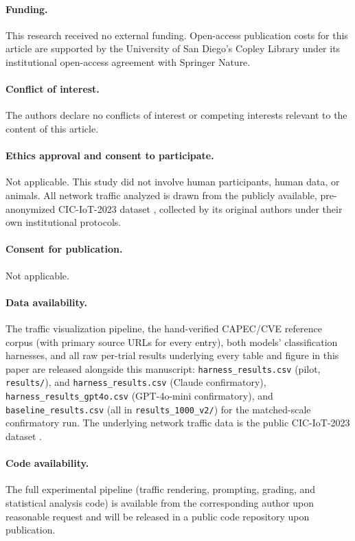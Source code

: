 \documentclass[10pt,twocolumn]{article}
\begin{document}
\paragraph{Funding.} This research received no external funding. Open-access publication costs
for this article are supported by the University of San Diego's Copley Library under its
institutional open-access agreement with Springer Nature.

\paragraph{Conflict of interest.} The authors declare no conflicts of interest or competing
interests relevant to the content of this article.

\paragraph{Ethics approval and consent to participate.} Not applicable. This study did not
involve human participants, human data, or animals. All network traffic analyzed is drawn from
the publicly available, pre-anonymized CIC-IoT-2023 dataset \cite{cic-iot-2023}, collected by its
original authors under their own institutional protocols.

\paragraph{Consent for publication.} Not applicable.

\paragraph{Data availability.} The traffic visualization pipeline, the hand-verified CAPEC/CVE
reference corpus (with primary source URLs for every entry), both models' classification
harnesses, and all raw per-trial results underlying every table and figure in this paper are
released alongside this manuscript: \texttt{harness\_results.csv} (pilot, \texttt{results/}), and
\texttt{harness\_results.csv} (Claude confirmatory), \texttt{harness\_results\_gpt4o.csv}
(GPT-4o-mini confirmatory), and \texttt{baseline\_results.csv} (all in
\texttt{results\_1000\_v2/}) for the matched-scale confirmatory run. The underlying network
traffic data is the public CIC-IoT-2023 dataset \cite{cic-iot-2023}.

\paragraph{Code availability.} The full experimental pipeline (traffic rendering, prompting,
grading, and statistical analysis code) is available from the corresponding author upon
reasonable request and will be released in a public code repository upon publication.
\end{document}
